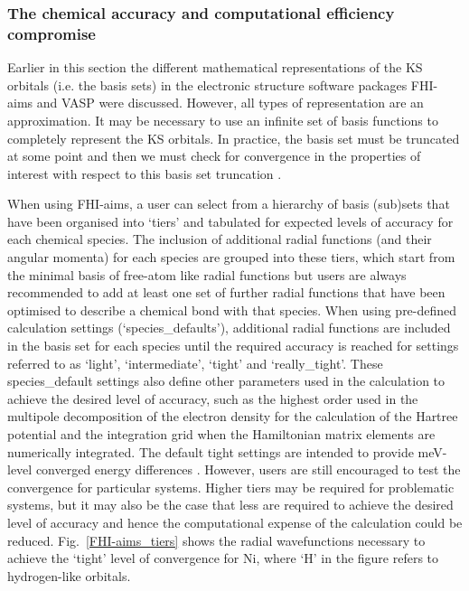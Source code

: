 \documentclass[11pt, twoside]{report}
\begin{document}
\subsubsection{The chemical accuracy and computational efficiency compromise}\label{chem_acc_vs_eff}
Earlier in this section the different mathematical representations of the KS orbitals (i.e. the basis sets) in the electronic structure software packages FHI-aims and VASP were discussed. However, all types of representation are an approximation. It may be necessary to use an infinite set of basis functions to completely represent the KS orbitals. In practice, the basis set must be truncated at some point and then we must check for convergence in the properties of interest with respect to this basis set truncation \cite{Prasad_ch6}. 

When using FHI-aims, a user can select from a hierarchy of basis (sub)sets that have been organised into `tiers' and tabulated for expected levels of accuracy for each chemical species. The inclusion of additional radial functions (and their angular momenta) for each species are grouped into these tiers, which start from the minimal basis of free-atom like radial functions but users are always recommended to add at least one set of further radial functions that have been optimised to describe a chemical bond with that species.  When using pre-defined calculation settings (`species\_defaults'), additional radial functions are included in the basis set for each species until the required accuracy is reached for settings referred to as `light', `intermediate', `tight' and `really\_tight'. These species\_default settings also define other parameters used in the calculation to achieve the desired level of accuracy, such as the highest order used in the multipole decomposition of the electron density for the calculation of the Hartree potential and the integration grid when the Hamiltonian matrix elements are numerically integrated. The default tight settings are intended to provide meV-level converged energy differences \cite{FHI-aims_manual}. However, users are still encouraged to test the convergence for particular systems. Higher tiers may be required for problematic systems, but it may also be the case that less are required to achieve the desired level of accuracy and hence the computational expense of the calculation could be reduced. Fig.~\ref{FHI-aims_tiers} shows the radial wavefunctions necessary to achieve the `tight' level of convergence for Ni, where `H' in the figure refers to hydrogen-like orbitals. 
\end{document}
